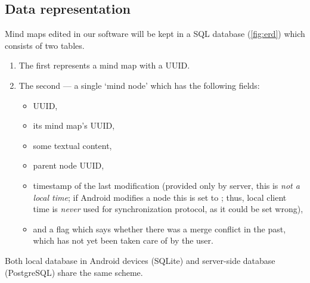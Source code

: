 %
%
%
%
%

\subsection{Data representation}
\label{subsec:data-repr}

Mind maps edited in our software will be kept in a SQL database (\cref{fig:erd}) which consists of two tables.

\begin{enumerate}
	\item The first represents a mind map with a UUID.
	\item The second --- a single `mind node' which has the following fields: \begin{itemize}
		\item UUID,
		\item its mind map's UUID,
		\item some textual content,
		\item parent node UUID,
		\item timestamp of the last modification (provided only by server, this is \emph{not a local time}; if Android modifies a node this is set to ; thus, local client time is \emph{never} used for synchronization protocol, as it could be set wrong),
		\item and a flag which says whether there was a merge conflict in the past, which has not yet been taken care of by the user.
	\end{itemize}
\end{enumerate}

Both local database in Android devices (SQLite) and server-side database (PostgreSQL) share the same scheme.


